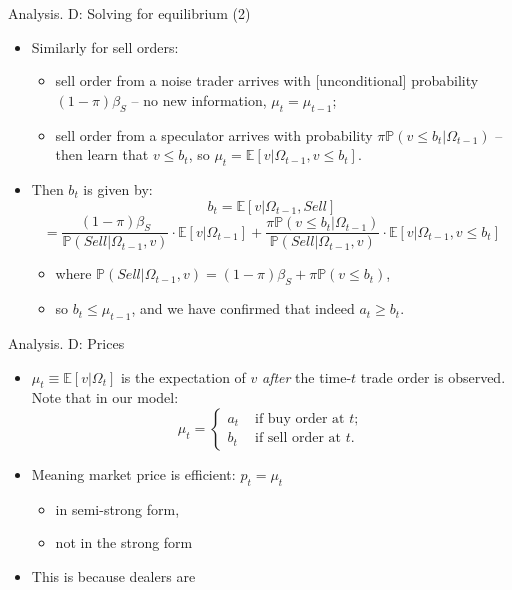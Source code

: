 \documentclass[english,10pt]{beamer}
\begin{document}
\begin{frame}{Analysis. D: Solving for equilibrium (2)}
	\begin{itemize}
		\item Similarly for \alert{sell orders}:
		\begin{itemize}
			\item sell order from a noise trader arrives with [unconditional] probability $(1-\pi)\beta_S$ -- no new information, $\mu_t = \mu_{t-1}$;
			\item sell order from a speculator arrives with probability $\pi \mathbb{P}(v \leq b_t | \Omega_{t-1})$ -- then learn that $v \leq b_t$, so $\mu_t = \mathbb{E} [v | \Omega_{t-1}, v \leq b_t]$.
		\end{itemize}
		\item Then $b_t$ is given by:
		$$ b_t = \mathbb{E}[v|\Omega_{t-1}, Sell] $$
		$$ = \frac{(1-\pi)\beta_S}{\mathbb{P}(Sell|\Omega_{t-1}, v)} \cdot \mathbb{E}[v|\Omega_{t-1}] + \frac{\pi \mathbb{P}(v \leq b_t | \Omega_{t-1})}{\mathbb{P}(Sell|\Omega_{t-1}, v)} \cdot \mathbb{E} [v | \Omega_{t-1}, v \leq b_t] $$
		\begin{itemize}
			\item where $\mathbb{P}(Sell|\Omega_{t-1}, v) = (1-\pi) \beta_S + \pi \mathbb{P}(v\leq b_t)$,
			\item so $b_t \leq \mu_{t-1}$, and we have confirmed that indeed $a_t \geq b_t$.
		\end{itemize}
	\end{itemize}
\end{frame}


\begin{frame}{Analysis. D: Prices}
	\begin{itemize}
		\item $\mu_t \equiv \mathbb{E}[v | \Omega_t]$ is the expectation of $v$ \textit{after} the time-$t$ trade order is observed. Note that in our model:
		$$\mu_t = \begin{cases}
			a_t & \text{ if buy order at } t;
			\\
			b_t & \text{ if sell order at } t.
		\end{cases} $$
		\item Meaning market price is efficient: $p_t = \mu_t$
		\begin{itemize}
			\item in \alert{semi-strong} form,
			\item not in the \alert{strong} form
		\end{itemize}
		\item This is because dealers are 
	\end{itemize}
\end{frame}
\end{document}
